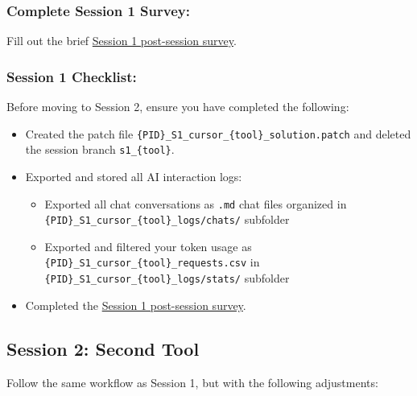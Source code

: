 \documentclass[11pt, a4paper]{article}
\begin{document}
\subsubsection*{Complete Session 1 Survey:}
\label{sec:session-1-survey}

Fill out the brief \href{https://forms.gle/dPJY5vYg6XwU4T5b8}{Session 1 post-session survey}.

\subsubsection*{Session 1 Checklist:}
\label{sec:session-1-checklist}
Before moving to Session 2, ensure you have completed the following:
\begin{itemize}
    \item Created the patch file \verb|{PID}_S1_cursor_{tool}_solution.patch| and deleted the session branch \verb|s1_{tool}|.
    \item Exported and stored all AI interaction logs:
    \begin{itemize}
        \item Exported all chat conversations as \verb|.md| chat files organized in \verb|{PID}_S1_cursor_{tool}_logs/chats/| subfolder
        \item Exported and filtered your token usage as \verb|{PID}_S1_cursor_{tool}_requests.csv| in \verb|{PID}_S1_cursor_{tool}_logs/stats/| subfolder
    \end{itemize}
    \item Completed the \href{https://forms.gle/dPJY5vYg6XwU4T5b8}{Session 1 post-session survey}.
\end{itemize}

\newpage

\subsection{Session 2: Second Tool}
\label{sec:session-2-tool-b}

Follow the same workflow as Session 1, but with the following adjustments:
\end{document}
